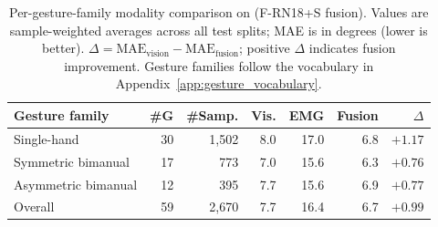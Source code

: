 \begin{table}[h]
\centering
\caption{Per-gesture-family modality comparison on \dataset{} (F-RN18+S fusion). Values are sample-weighted averages across all test splits; MAE is in degrees (lower is better). $\Delta = \text{MAE}_\text{vision} - \text{MAE}_\text{fusion}$; positive $\Delta$ indicates fusion improvement. Gesture families follow the vocabulary in Appendix~\ref{app:gesture_vocabulary}.}
\label{tab:per_gesture_family}
\footnotesize
\setlength{\tabcolsep}{3.8pt}
\renewcommand{\arraystretch}{1.08}
\begin{tabular}{lrrrrrr}
\toprule
Gesture family & \#G & \#Samp. & Vis. & EMG & Fusion & $\Delta$ \\
\midrule
Single-hand & 30 & 1,502 & 8.0 & 17.0 & 6.8 & $\mathbf{+1.17}$ \\
Symmetric bimanual & 17 & 773 & 7.0 & 15.6 & 6.3 & $+0.76$ \\
Asymmetric bimanual & 12 & 395 & 7.7 & 15.6 & 6.9 & $+0.77$ \\
\midrule
Overall & 59 & 2,670 & 7.7 & 16.4 & 6.7 & $+0.99$ \\
\bottomrule
\end{tabular}
\end{table}